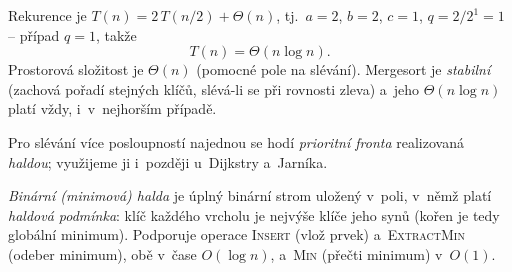 \documentclass[11pt,a4paper]{article}
\begin{document}
Rekurence je $T(n)=2\,T(n/2)+\Theta(n)$, tj.\ $a=2$, $b=2$, $c=1$, $q=2/2^1=1$ -- případ $q=1$, takže
\[
T(n)=\Theta(n\log n).
\]
Prostorová složitost je $\Theta(n)$ (pomocné pole na slévání). Mergesort je \emph{stabilní} (zachová pořadí stejných klíčů, slévá-li se při rovnosti zleva) a~jeho $\Theta(n\log n)$ platí vždy, i~v~nejhorším případě.

Pro slévání více posloupností najednou se hodí \emph{prioritní fronta} realizovaná \emph{haldou}; využijeme ji i~později u~Dijkstry a~Jarníka.

\begin{definice}
\emph{Binární (minimová) halda} je úplný binární strom uložený v~poli, v~němž platí \emph{haldová podmínka}: klíč každého vrcholu je nejvýše klíče jeho synů (kořen je tedy globální minimum). Podporuje operace \textsc{Insert} (vlož prvek) a~\textsc{ExtractMin} (odeber minimum), obě v~čase $O(\log n)$, a~\textsc{Min} (přečti minimum) v~$O(1)$.
\end{definice}
\end{document}
